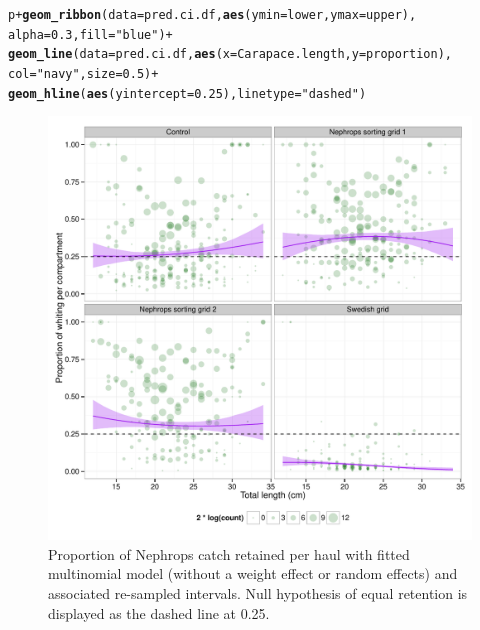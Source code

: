 \documentclass[12pt]{article}\usepackage[]{graphicx}\usepackage[]{color}
\makeatletter
\def\maxwidth{ %
  \ifdim\Gin@nat@width>\linewidth
    \linewidth
  \else
    \Gin@nat@width
  \fi
}
\newcommand{\hlnum}[1]{\textcolor[rgb]{0.686,0.059,0.569}{#1}}%
\newcommand{\hlstr}[1]{\textcolor[rgb]{0.192,0.494,0.8}{#1}}%
\newcommand{\hlopt}[1]{\textcolor[rgb]{0,0,0}{#1}}%
\newcommand{\hlstd}[1]{\textcolor[rgb]{0.345,0.345,0.345}{#1}}%
\newcommand{\hlkwc}[1]{\textcolor[rgb]{0.333,0.667,0.333}{#1}}%
\newcommand{\hlkwd}[1]{\textcolor[rgb]{0.737,0.353,0.396}{\textbf{#1}}}%
\newenvironment{kframe}{%
 \def\at@end@of@kframe{}%
 \ifinner\ifhmode%
  \def\at@end@of@kframe{\end{minipage}}%
  \begin{minipage}{\columnwidth}%
 \fi\fi%
 \def\FrameCommand##1{\hskip\@totalleftmargin \hskip-\fboxsep
 \colorbox{shadecolor}{##1}\hskip-\fboxsep
     \hskip-\linewidth \hskip-\@totalleftmargin \hskip\columnwidth}%
 \MakeFramed {\advance\hsize-\width
   \@totalleftmargin\z@ \linewidth\hsize
   \@setminipage}}%
 {\par\unskip\endMakeFramed%
 \at@end@of@kframe}
\newenvironment{knitrout}{}{} %
\makeatother
\begin{document}
\begin{knitrout}\footnotesize
{}\color{fgcolor}\begin{kframe}
\begin{alltt}
\hlstd{p} \hlopt{+} \hlkwd{geom_ribbon}\hlstd{(}\hlkwc{data} \hlstd{= pred.ci.df,} \hlkwd{aes}\hlstd{(}\hlkwc{ymin} \hlstd{= lower,} \hlkwc{ymax} \hlstd{= upper),}
                \hlkwc{alpha} \hlstd{=} \hlnum{0.3}\hlstd{,} \hlkwc{fill} \hlstd{=} \hlstr{"blue"}\hlstd{)} \hlopt{+}
  \hlkwd{geom_line}\hlstd{(}\hlkwc{data} \hlstd{= pred.ci.df,} \hlkwd{aes}\hlstd{(}\hlkwc{x} \hlstd{= Carapace.length,} \hlkwc{y} \hlstd{= proportion),}
            \hlkwc{col} \hlstd{=} \hlstr{"navy"}\hlstd{,} \hlkwc{size} \hlstd{=} \hlnum{0.5}\hlstd{)} \hlopt{+}
  \hlkwd{geom_hline}\hlstd{(}\hlkwd{aes}\hlstd{(}\hlkwc{yintercept} \hlstd{=} \hlnum{0.25}\hlstd{),} \hlkwc{linetype} \hlstd{=} \hlstr{"dashed"}\hlstd{)}
\end{alltt}
\end{kframe}\begin{figure}
\includegraphics[width=\maxwidth]{figure/unnamed-chunk-8-1} \caption[Proportion of Nephrops catch retained per haul with fitted multinomial model (without a weight effect or random effects) and associated re-sampled intervals]{Proportion of Nephrops catch retained per haul with fitted multinomial model (without a weight effect or random effects) and associated re-sampled intervals. Null hypothesis of equal retention is displayed as the dashed line at 0.25.}\label{fig:unnamed-chunk-8}
\end{figure}


\end{knitrout}
\end{document}
